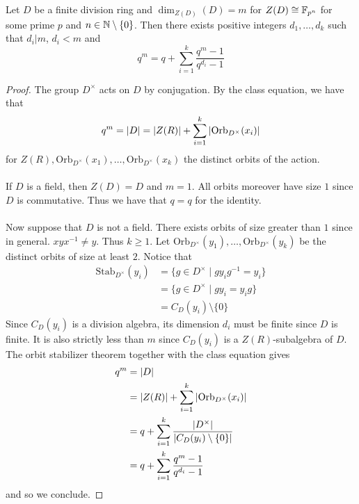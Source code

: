 \documentclass[a4paper]{article}
\begin{document}
\begin{prp}{}{} Let $D$ be a finite division ring and $\dim_{Z(D)}(D)=m$ for $Z(D)\cong\mathbb{F}_{p^n}$ for some prime $p$ and $n\in\mathbb{N}\setminus\{0\}$. Then there exists positive integers $d_1,\dots,d_k$ such that $d_i|m$, $d_i<m$ and $$q^m=q+\sum_{i=1}^k\frac{q^m-1}{q^{d_i}-1}$$ \tcbline
\begin{proof}
The group $D^\times$ acts on $D$ by conjugation. By the class equation, we have that $$q^m=\abs{D}=\abs{Z(R)}+\sum_{i=1}^k\abs{\text{Orb}_{D^\times}(x_i)}$$ for $Z(R),\text{Orb}_{D^\times}(x_1),\dots,\text{Orb}_{D^\times}(x_k)$ the distinct orbits of the action. \\~\\

If $D$ is a field, then $Z(D)=D$ and $m=1$. All orbits moreover have size $1$ since $D$ is commutative. Thus we have that $q=q$ for the identity. \\~\\

Now suppose that $D$ is not a field. There exists orbits of size greater than $1$ since in general. $xyx^{-1}\neq y$. Thus $k\geq 1$. Let $\text{Orb}_{D^\times}(y_1),\dots,\text{Orb}_{D^\times}(y_k)$ be the distinct orbits of size at least $2$. Notice that 
\begin{align*}
\text{Stab}_{D^\times}(y_i)&=\{g\in D^\times\;|\;gy_ig^{-1}=y_i\}\\
&=\{g\in D^\times\;|\;gy_i=y_ig\}\\
&=C_D(y_i)\setminus\{0\}
\end{align*}
Since $C_D(y_i)$ is a division algebra, its dimension $d_i$ must be finite since $D$ is finite. It is also strictly less than $m$ since $C_D(y_i)$ is a $Z(R)$-subalgebra of $D$. The orbit stabilizer theorem together with the class equation gives 
\begin{align*}
q^m&=\abs{D}\\
&=\abs{Z(R)}+\sum_{i=1}^k\abs{\text{Orb}_{D^\times}(x_i)}\\
&=q+\sum_{i=1}^k\frac{\abs{D^\times}}{\abs{C_D(y_i)\setminus\{0\}}}\\
&=q+\sum_{i=1}^k\frac{q^m-1}{q^{d_i}-1}
\end{align*}
and so we conclude. 
\end{proof}
\end{prp}
\end{document}
